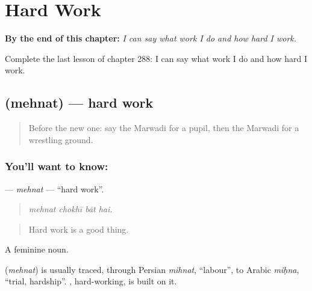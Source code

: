 
\chapter{Hard Work}
\label{ch:mw-hard-work}

\begin{chapteropening}
\textbf{By the end of this chapter:} \emph{I can say what work I do and how hard I work.}

Complete the last lesson of chapter 288: I can say what work I do and how hard I work.
\end{chapteropening}

\section[\texorpdfstring{\mw{मेहनत} (mehnat)}{मेहनत (mehnat)}]{ (mehnat) — hard work}

\label{lesson:MW-C288-mehnat}



\begin{quote}
Before the new one: say the Marwadi for a pupil, then the Marwadi for a wrestling ground.
\end{quote}

\subsection*{You'll want to know: }
\textbf{} — \emph{mehnat} — \textquotedblleft{}hard work\textquotedblright{}.

\begin{quote}
   
\end{quote}

\begin{quote}
\emph{mehnat chokhī bāt hai.}
\end{quote}

\begin{quote}
Hard work is a good thing.
\end{quote}

A feminine noun.

\begin{cousinweb}
\textbf{} (\emph{mehnat}) is usually traced, through Persian \emph{mihnat}, \textquotedblleft{}labour\textquotedblright{}, to Arabic \emph{miḥna}, \textquotedblleft{}trial, hardship\textquotedblright{}. \textbf{}, hard-working, is built on it.
\end{cousinweb}

